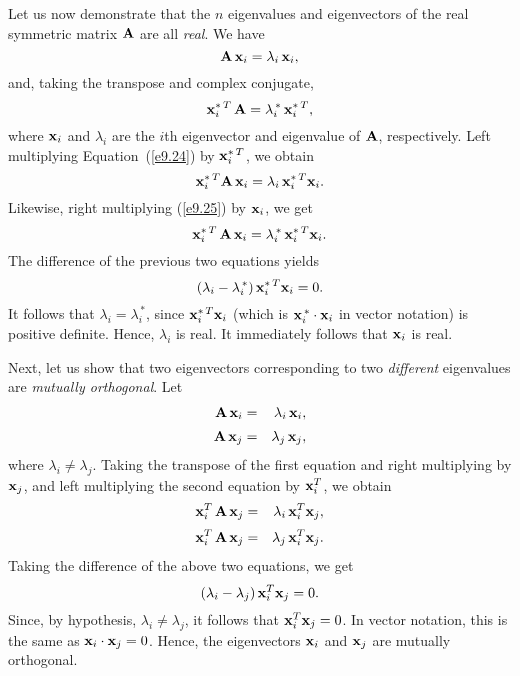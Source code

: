 Let us now demonstrate that the $n$ eigenvalues and eigenvectors of the real symmetric matrix
${\bf A}$ are all {\em real}. We have
\begin{equation}\label{e9.24}
{\bf A}\,{\bf x}_i = \lambda_i\,{\bf x}_i,
\end{equation}
and, taking the transpose and complex conjugate, 
\begin{equation}\label{e9.25}
{\bf x}_i^{\ast\,T}\,{\bf A} = \lambda_i^{\,\ast}\,{\bf x}_i^{\ast\,T},
\end{equation}
where ${\bf x}_i$ and $\lambda_i$ are the $i$th eigenvector and eigenvalue
of ${\bf A}$, respectively. Left multiplying Equation~(\ref{e9.24}) by
${\bf x}_i^{\ast\,T}$, we obtain
\begin{equation}
{\bf x}_i^{\ast\,T} {\bf A}\,{\bf x}_i = \lambda_i\,{\bf x}_i^{\ast\,T}{\bf x}_i.
\end{equation}
Likewise, right multiplying (\ref{e9.25}) by ${\bf x}_i$, we get
\begin{equation}
{\bf x}_i^{\ast\,T}\,{\bf A}\,{\bf x}_i = \lambda_i^{\,\ast}\,{\bf x}_i^{\ast\,T}{\bf x}_i.
\end{equation}
The difference of the previous two equations yields
\begin{equation}
(\lambda_i - \lambda_i^{\,\ast})\,{\bf x}_i^{\ast\,T} {\bf x}_i = 0.
\end{equation}
It follows that $\lambda_i=\lambda_i^{\,\ast}$, since ${\bf x}_i^{\ast\,T}{\bf x}_i$ (which is ${\bf x}_i^{\,\ast}\cdot{\bf x}_i$ in vector notation) is positive definite. Hence, $\lambda_i$ is real.
It immediately follows that ${\bf x}_i$ is real.

Next, let us show that two eigenvectors corresponding to two {\em different}\/ eigenvalues are {\em mutually orthogonal}. Let
\begin{eqnarray}
{\bf A}\,{\bf x}_i &=& \lambda_i\,{\bf x}_i,\\[0.5ex]
{\bf A}\,{\bf x}_j&=& \lambda_j\,{\bf x}_j,
\end{eqnarray}
where $\lambda_i\neq \lambda_j$. Taking the transpose of the first equation and right multiplying by ${\bf x}_j$, and left multiplying the second
equation by ${\bf x}_i^T$, we obtain
\begin{eqnarray}
{\bf x}_i^T\,{\bf A}\,{\bf x}_j &=& \lambda_i\,{\bf x}_i^T{\bf x}_j,\\[0.5ex]
{\bf x}_i^T\,{\bf A}\,{\bf x}_j&=& \lambda_j\,{\bf x}_i^T{\bf x}_j.
\end{eqnarray}
Taking the difference of the above two equations, we get
\begin{equation}
(\lambda_i-\lambda_j)\,{\bf x}_i^T{\bf x}_j = 0.
\end{equation}
Since, by hypothesis, $\lambda_i\neq \lambda_j$, it follows
that ${\bf x}_i^T{\bf x}_j = 0$. In vector notation, this is the same
as ${\bf x}_i \cdot{\bf x}_j=0$. Hence, the eigenvectors ${\bf x}_i$ and
${\bf x}_j$ are mutually orthogonal. 

